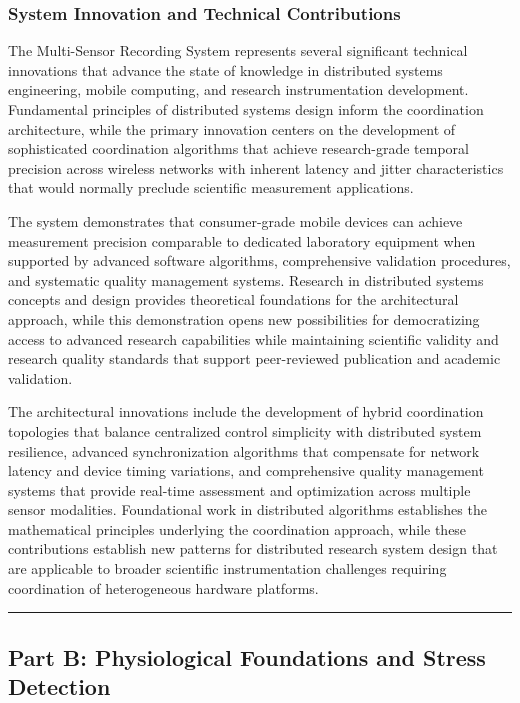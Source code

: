 \documentclass[12pt,a4paper]{article}
\begin{document}
\subsubsection{System Innovation and Technical Contributions}

The Multi-Sensor Recording System represents several significant technical innovations that advance the state of
knowledge in distributed systems engineering, mobile computing, and research instrumentation development. Fundamental
principles of distributed systems design inform the coordination architecture, while the primary innovation centers on
the development of sophisticated coordination algorithms that achieve research-grade temporal precision across wireless
networks with inherent latency and jitter characteristics that would normally preclude scientific measurement
applications.

The system demonstrates that consumer-grade mobile devices can achieve measurement precision comparable to dedicated
laboratory equipment when supported by advanced software algorithms, comprehensive validation procedures, and systematic
quality management systems. Research in distributed systems concepts and design provides theoretical foundations for the
architectural approach, while this demonstration opens new possibilities for democratizing access to advanced research
capabilities while maintaining scientific validity and research quality standards that support peer-reviewed publication
and academic validation.

The architectural innovations include the development of hybrid coordination topologies that balance centralized control
simplicity with distributed system resilience, advanced synchronization algorithms that compensate for network latency
and device timing variations, and comprehensive quality management systems that provide real-time assessment and
optimization across multiple sensor modalities. Foundational work in distributed algorithms establishes the mathematical
principles underlying the coordination approach, while these contributions establish new patterns for distributed
research system design that are applicable to broader scientific instrumentation challenges requiring coordination of
heterogeneous hardware platforms.

\hrule

\subsection{Part B: Physiological Foundations and Stress Detection}
\end{document}
